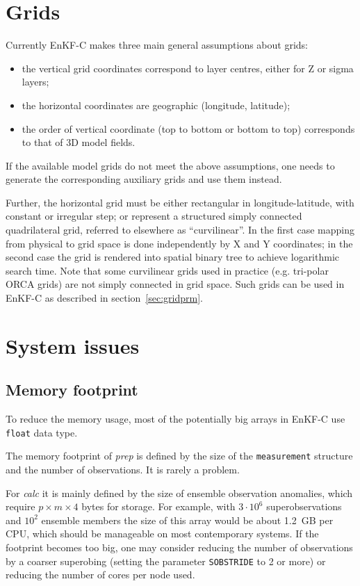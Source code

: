 \documentclass[11pt]{report}
\begin{document}
\section{Grids}

Currently EnKF-C makes three main general assumptions about grids:
\begin{itemize}
\item the vertical grid coordinates correspond to layer centres, either for Z or sigma layers;
\item the horizontal coordinates are geographic (longitude, latitude);
\item the order of vertical coordinate (top to bottom or bottom to top) corresponds to that of 3D model fields.
\end{itemize}
If the available model grids do not meet the above assumptions, one needs to generate the corresponding auxiliary grids and use them instead.

Further, the horizontal grid must be either rectangular in longitude-latitude, with constant or irregular step; or represent a structured simply connected quadrilateral grid, referred to elsewhere as ``curvilinear''.
In the first case mapping from physical to grid space is done independently by X and Y coordinates; in the second case the grid is rendered into spatial binary tree to achieve logarithmic search time.
Note that some curvilinear grids used in practice (e.g. tri-polar ORCA grids) are not simply connected in grid space.
Such grids can be used in EnKF-C as described in section~\ref{sec:gridprm}.

\section{System issues}

\subsection{Memory footprint}

To reduce the memory usage, most of the potentially big arrays in EnKF-C use \verb|float| data type.

The memory footprint of \emph{prep} is defined by the size of the \verb|measurement| structure and the number of observations.
It is rarely a problem.

For \emph{calc} it is mainly defined by the size of ensemble observation anomalies, which require $p \times m \times 4$ bytes for storage.
For example, with $3 \cdot 10^6$ superobservations and $10^2$ ensemble members the size of this array would be about 1.2\, GB per CPU, which should be manageable on most contemporary systems.
If the footprint becomes too big, one may consider reducing the number of observations by a coarser superobing (setting the parameter \verb|SOBSTRIDE| to 2 or more) or reducing the number of cores per node used.
\end{document}
